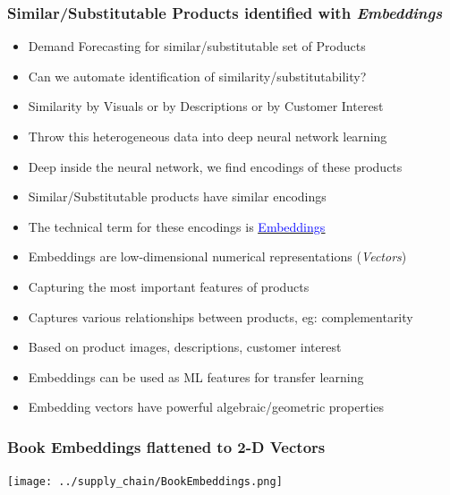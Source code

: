 \documentclass[handout]{beamer}
\begin{document}
\begin{frame}
\frametitle{Similar/Substitutable Products identified with {\em Embeddings}}
\pause
\begin{itemize}[<+->]
\item Demand Forecasting for similar/substitutable set of Products
\item Can we automate identification of similarity/substitutability?
\item Similarity by Visuals or by Descriptions or by Customer Interest
\item Throw this heterogeneous data into deep neural network learning
\item Deep inside the neural network, we find encodings of these products
\item Similar/Substitutable products have similar encodings
\item The technical term for these encodings is \href{https://developers.google.com/machine-learning/crash-course/embeddings/video-lecture}{\underline{\textcolor{blue}{Embeddings}}}
\item Embeddings are low-dimensional numerical representations ({\em Vectors})
\item Capturing the most important features of products
\item Captures various relationships between products, eg: complementarity
\item Based on product images, descriptions, customer interest
\item Embeddings can be used as ML features for transfer learning
\item Embedding vectors have powerful algebraic/geometric properties
\end{itemize}
\end{frame}

\begin{frame}
\frametitle{Book Embeddings flattened to 2-D Vectors}
\texttt{[image: ../supply\_chain/BookEmbeddings.png]}
\end{frame}
\end{document}
